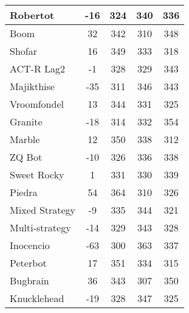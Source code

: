 \begin{table*}
\begin{tabular}{|l|c|c|c|c|}
Robertot & -16 & 324 & 340 & 336 \\ \hline 
Boom & 32 & 342 & 310 & 348 \\ \hline 
Shofar & 16 & 349 & 333 & 318 \\ \hline 
ACT-R Lag2 & -1 & 328 & 329 & 343 \\ \hline 
Majikthise & -35 & 311 & 346 & 343 \\ \hline 
Vroomfondel & 13 & 344 & 331 & 325 \\ \hline 
Granite & -18 & 314 & 332 & 354 \\ \hline 
Marble & 12 & 350 & 338 & 312 \\ \hline 
ZQ Bot & -10 & 326 & 336 & 338 \\ \hline 
Sweet Rocky & 1 & 331 & 330 & 339 \\ \hline 
Piedra & 54 & 364 & 310 & 326 \\ \hline 
Mixed Strategy & -9 & 335 & 344 & 321 \\ \hline 
Multi-strategy & -14 & 329 & 343 & 328 \\ \hline 
Inocencio & -63 & 300 & 363 & 337 \\ \hline 
Peterbot & 17 & 351 & 334 & 315 \\ \hline 
Bugbrain & 36 & 343 & 307 & 350 \\ \hline 
Knucklehead & -19 & 328 & 347 & 325 \\ \hline
        \end{tabular}
    \end{table*}